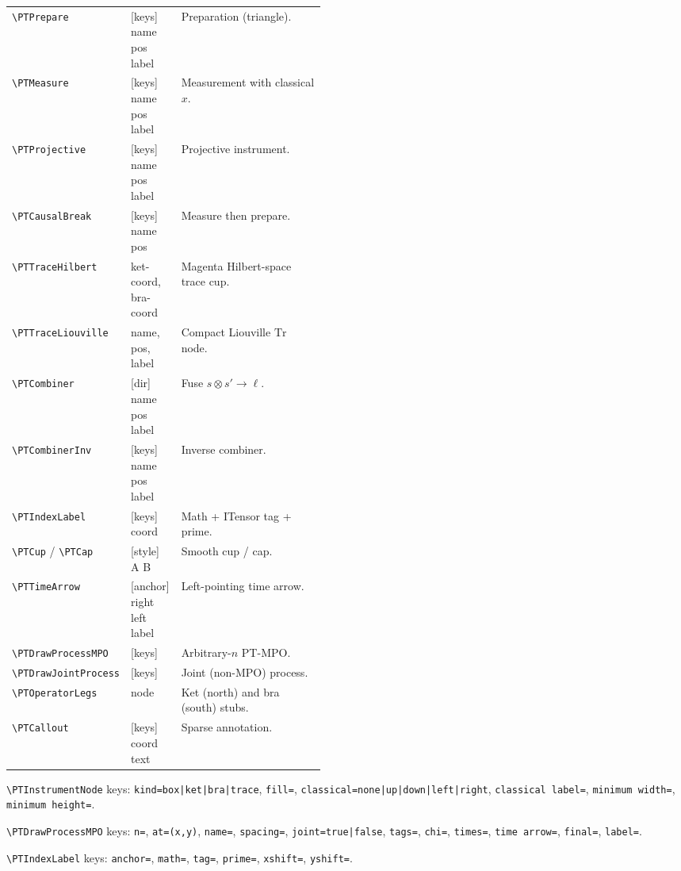 \documentclass[11pt,a4paper]{article}
\begin{document}
\begin{tabular}{@{}llp{0.46\linewidth}@{}}
\verb|\PTPrepare| & [keys] name pos label & Preparation (triangle). \\
\verb|\PTMeasure| & [keys] name pos label & Measurement with classical \(x\). \\
\verb|\PTProjective| & [keys] name pos label & Projective instrument. \\
\verb|\PTCausalBreak| & [keys] name pos & Measure then prepare. \\
\verb|\PTTraceHilbert| & ket-coord, bra-coord & Magenta Hilbert-space trace cup. \\
\verb|\PTTraceLiouville| & name, pos, label & Compact Liouville \(\mathrm{Tr}\) node. \\
\verb|\PTCombiner| & [dir] name pos label & Fuse \(s\otimes s'\to\ell\). \\
\verb|\PTCombinerInv| & [keys] name pos label & Inverse combiner. \\
\verb|\PTIndexLabel| & [keys] coord & Math + ITensor tag + prime. \\
\verb|\PTCup| / \verb|\PTCap| & [style] A B & Smooth cup / cap. \\
\verb|\PTTimeArrow| & [anchor] right left label & Left-pointing time arrow. \\
\verb|\PTDrawProcessMPO| & [keys] & Arbitrary-\(n\) PT-MPO. \\
\verb|\PTDrawJointProcess| & [keys] & Joint (non-MPO) process. \\
\verb|\PTOperatorLegs| & node & Ket (north) and bra (south) stubs. \\
\verb|\PTCallout| & [keys] coord text & Sparse annotation. \\
\bottomrule
\end{tabular}

\vspace{0.8em}
\noindent
\verb|\PTInstrumentNode| keys:
\texttt{kind=box|ket|bra|trace},
\texttt{fill=},
\texttt{classical=none|up|down|left|right},
\texttt{classical label=},
\texttt{minimum width=},
\texttt{minimum height=}.

\vspace{0.4em}
\noindent
\verb|\PTDrawProcessMPO| keys:
\texttt{n=},
\texttt{at=(x,y)},
\texttt{name=},
\texttt{spacing=},
\texttt{joint=true|false},
\texttt{tags=},
\texttt{chi=},
\texttt{times=},
\texttt{time arrow=},
\texttt{final=},
\texttt{label=}.

\vspace{0.4em}
\noindent
\verb|\PTIndexLabel| keys:
\texttt{anchor=},
\texttt{math=},
\texttt{tag=},
\texttt{prime=},
\texttt{xshift=},
\texttt{yshift=}.
\end{document}
